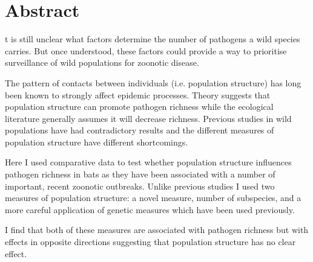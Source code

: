 





\section{Abstract}


t is still unclear what factors determine the number of pathogens a wild species carries.
But once understood, these factors could provide a way to prioritise surveillance of wild populations for zoonotic disease.



% 

The pattern of contacts between individuals (i.e. population structure) has long been known to strongly affect epidemic processes.
Theory suggests that population structure can promote pathogen richness while the ecological literature generally assumes it will decrease richness.
Previous studies in wild populations have had contradictory results and the different measures of population structure have different shortcomings.



Here I used comparative data to test whether population structure influences pathogen richness in bats as they have been associated with a number of important, recent zoonotic outbreaks.
Unlike previous studies I used two measures of population structure: a novel measure, number of subspecies, and a more careful application of genetic measures which have been used previously.


I find that both of these measures are associated with pathogen richness but with effects in opposite directions suggesting that population structure has no clear effect.



